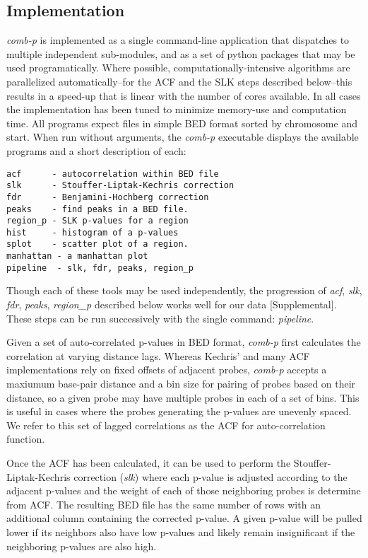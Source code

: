 \documentclass{bioinfo}
\begin{document}
\begin{methods}

\section{Implementation}

\textit{comb-p} is implemented as a single command-line application that
dispatches to multiple independent sub-modules, and as a set of python
packages that may be used programatically. Where possible,
computationally-intensive algorithms are parallelized
automatically--for the ACF and the SLK steps described below--this
results in a speed-up that is linear with the number of cores available.
In all cases the implementation has been tuned to minimize memory-use and
computation time. All programs expect files in simple BED format \citep{Kent2002}
sorted by chromosome and start.
When run without arguments, the \textit{comb-p} executable displays the
available programs and a short description of each:
\begin{verbatim}
acf      - autocorrelation within BED file
slk      - Stouffer-Liptak-Kechris correction
fdr      - Benjamini-Hochberg correction
peaks    - find peaks in a BED file.
region_p - SLK p-values for a region
hist     - histogram of a p-values
splot    - scatter plot of a region.
manhattan - a manhattan plot
pipeline  - slk, fdr, peaks, region_p
\end{verbatim}
Though each of these tools may be used independently, the progression of
\textit{acf}, \textit{slk}, \textit{fdr}, \textit{peaks}, \textit{region\_p}
described below works well for our data [Supplemental]. These steps can
be run successively with the single command: \textit{pipeline}.

Given a set of auto-correlated p-values in BED format, \textit{comb-p} first
calculates the correlation at varying distance lags. Whereas Kechris' \citep{Kechris2010}
and many ACF implementations rely on fixed offsets of adjacent probes,
\textit{comb-p} accepts a maxiumum base-pair distance and a bin size
for pairing of probes based on their distance, so a given probe may
have multiple probes in each of a set of bins. This is useful in cases
where the probes generating the p-values are unevenly spaced. We refer
to this set of lagged correlations as the ACF for auto-correlation
function.

Once the ACF has been calculated, it can be used to perform the
Stouffer-Liptak-Kechris correction (\textit{slk}) where each p-value is
adjusted according to the adjacent p-values and the weight of each of
those neighboring probes is determine from ACF. The resulting BED file
has the same number of rows with an additional column containing the corrected
p-value. A given p-value will be pulled lower if its neighbors also have low
p-values and likely remain insignificant if the neighboring p-values are also
high.


\end{methods}
\end{document}
